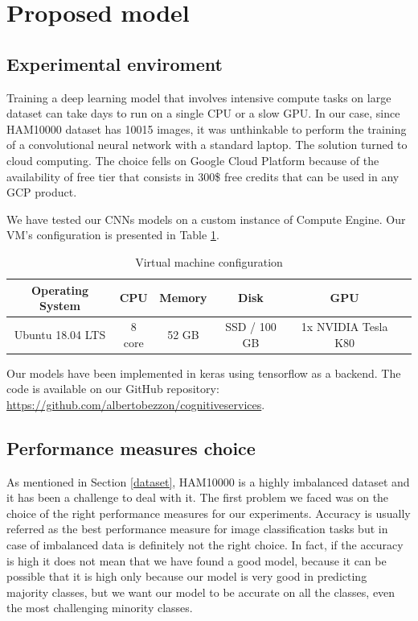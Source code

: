 \section{Proposed model} \label{proposed_model}

	\subsection{Experimental enviroment}
	
	Training a deep learning model that involves intensive compute tasks on large dataset can take days to run on a single CPU or a slow GPU. In our case, since HAM10000 dataset has 10015 images, it was unthinkable to perform the training of a convolutional neural network with a standard laptop. The solution turned to cloud computing. The choice fells on Google Cloud Platform because of the availability of free tier that consists in 300\$ free credits that can be used in any GCP product. 
	
	\smallskip
	
	We have tested our CNNs models on a custom instance of Compute Engine. Our VM’s configuration is presented in Table \ref{tab:hw-config}.
	
	\begin{table}[H]
		\centering
		\begin{tabular}{ |c|c|c|c|c|c| }
			\hline
			\textbf{Operating System} & \textbf{CPU} & \textbf{Memory} & \textbf{Disk} & \textbf{GPU} \\ \hline
			
			Ubuntu 18.04 LTS & 8 core & 52 GB & SSD / 100 GB & 1x NVIDIA Tesla K80 \\ \hline
			
		\end{tabular}
		\caption{Virtual machine configuration}
		\label{tab:hw-config}
	\end{table}
	
	Our models have been implemented in keras using tensorflow as a backend. The code is available on our GitHub repository: \url{https://github.com/albertobezzon/cognitiveservices}.

	\subsection{Performance measures choice}
		
		As mentioned in Section \ref{dataset}, HAM10000 is a highly imbalanced dataset and it has been a challenge to deal with it. The first problem we faced was on the choice of the right performance measures for our experiments. Accuracy is usually referred as the best performance measure for image classification tasks but in case of imbalanced data is definitely not the right choice. In fact, if the accuracy is high it does not mean that we have found a good model, because it can be possible that it is high only because our model is very good in predicting majority classes, but we want our model to be accurate on all the classes, even the most challenging minority classes.
		
